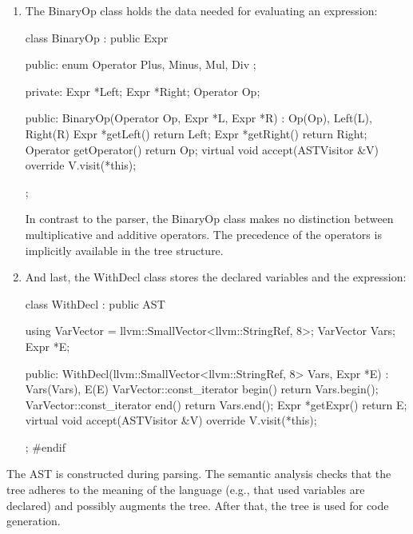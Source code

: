\begin{enumerate}
\item
The BinaryOp class holds the data needed for evaluating an expression:

\begin{cpp}
class BinaryOp : public Expr {
public:
    enum Operator { Plus, Minus, Mul, Div };

private:
    Expr *Left;
    Expr *Right;
    Operator Op;

public:
    BinaryOp(Operator Op, Expr *L, Expr *R)
        : Op(Op), Left(L), Right(R) {}
    Expr *getLeft() { return Left; }
    Expr *getRight() { return Right; }
    Operator getOperator() { return Op; }
    virtual void accept(ASTVisitor &V) override {
        V.visit(*this);
    }
};
\end{cpp}

In contrast to the parser, the BinaryOp class makes no distinction between multiplicative and additive operators. The precedence of the operators is implicitly available in the tree structure.

\item
And last, the WithDecl class stores the declared variables and the expression:

\begin{cpp}
class WithDecl : public AST {
    using VarVector =
        llvm::SmallVector<llvm::StringRef, 8>;
    VarVector Vars;
    Expr *E;

public:
    WithDecl(llvm::SmallVector<llvm::StringRef, 8> Vars,
            Expr *E)
        : Vars(Vars), E(E) {}
    VarVector::const_iterator begin()
                                { return Vars.begin(); }
    VarVector::const_iterator end() { return Vars.end(); }
    Expr *getExpr() { return E; }
    virtual void accept(ASTVisitor &V) override {
        V.visit(*this);
    }
};
#endif
\end{cpp}

\end{enumerate}

The AST is constructed during parsing. The semantic analysis checks that the tree adheres to the meaning of the language (e.g., that used variables are declared) and possibly augments the tree. After that, the tree is used for code generation.
